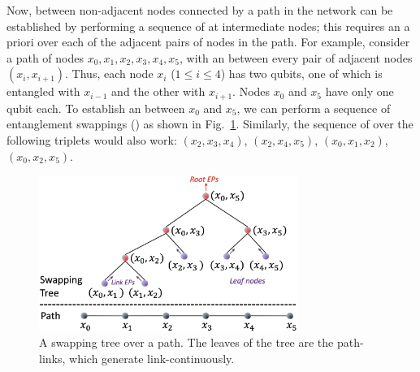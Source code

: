 Now, \eps between non-adjacent nodes connected by a path in the network 
can be established by 
performing a sequence of \ess at 
intermediate nodes; this requires an a priori \eps over 
each of the adjacent pairs of nodes in the path.
For example, consider a path of nodes $x_0, x_1, x_2, x_3, x_4, x_5$, with an \eps 
between every pair of adjacent nodes $(x_i, x_{i+1})$. Thus, each node $x_i$
($1 \leq i \leq 4$) has two qubits, one of which is entangled with $x_{i-1}$ 
and the other with
$x_{i+1}$. Nodes $x_0$ and $x_5$ have only one qubit each.
To establish an \eps 
between $x_0$ and $x_5$, we can perform a sequence of entanglement
swappings (\ess) as shown in Fig.~\ref{fig:swapping_tree}. 
Similarly, the sequence of \es over the following triplets would also 
work: $(x_2, x_3, x_4)$, $(x_2, x_4, x_5)$, $(x_0, x_1, x_2)$, 
$(x_0, x_2, x_5)$. 

\begin{figure}[h]
    \centering
    \includegraphics[width=0.75\textwidth]{chapters/swappingtrees/figures/swapping_tree.jpg}
    \caption{A swapping tree over a path. The leaves of the tree are the path-links, which generate link-\epss continuously.}
\label{fig:swapping_tree}
\end{figure}

